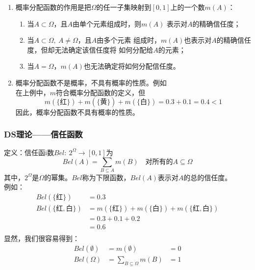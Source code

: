 \documentclass[12pt]{article}
\begin{document}
\begin{enumerate}
	\item{概率分配函数的作用是把$\Omega$的任一子集映射到$[0,1]$上的一个数$m(A)$：
		\begin{enumerate}
			\item{当$A\subset\Omega$，且$A$由单个元素组成时，则$m(A)$
			表示对$A$的精确信任度；}
			\item{当$A\subset\Omega,\ A\neq\Omega$，且$A$由多个元素
			组成时，$m(A)$也表示对$A$的精确信任度，但却无法确定该信任度将
			如何分配给$A$的元素；}
			\item{当$A=\Omega$，$m(A)$也无法确定将如何分配信任度。}
		\end{enumerate}
	}
	\item{概率分配函数不是概率，不具有概率的性质。例如\\
		在上例中，$m$符合概率分配函数的定义，但
		\[
			m(\{红\})+m(\{黄\})+m(\{白\})=0.3+0.1=0.4<1
		\]
	因此，概率分配函数不具有概率的性质。
	}
\end{enumerate}
\subsubsection{DS理论——信任函数}
定义：信任函i数$Bel:\ 2^\Omega \to [0,1]$为
\[
	Bel(A) = \sum_{B\subseteq A}m(B)\quad 对所有的 A\subseteq\Omega
\]
其中，$2^\Omega$是$\Omega$的幂集。$Bel$称为下限函数，$Bel(A)$表示对$A$的总的信任度。\\
例如： 
\[
	\begin{aligned}
		Bel(\{红\})&=0.3\\
		Bel(\{红,白\})&=m(\{红\})+m(\{白\})+m(\{红,白\})\\
		&=0.3+0.1+0.2\\
		&=0.6\\
	\end{aligned}
\]
显然，我们很容易得到：
\[
	\begin{aligned}
		Bel(\emptyset)&=m(\emptyset)&=0\\
		Bel(\Omega)&=\sum_{B\subseteq\Omega}m(B)&=1\\
	\end{aligned}
\]
\end{document}
